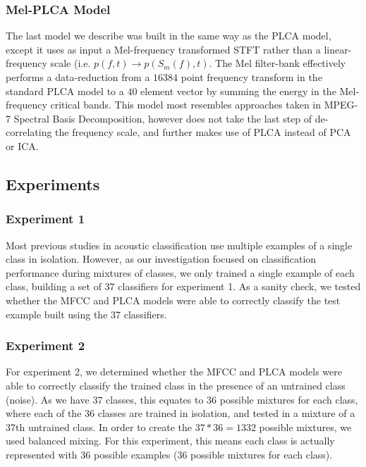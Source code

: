 \documentclass[a4paper,10pt,final]{ThesisStyle}
\begin{document}

\subsubsection{Mel-PLCA Model}

The last model we describe was built in the same way as the PLCA model, except it uses as input a Mel-frequency transformed STFT rather than a linear-frequency scale (i.e. $p(f,t) \rightarrow p(S_m(f),t)$.  The Mel filter-bank effectively performs a data-reduction from a $16384$ point frequency transform in the standard PLCA model to a $40$ element vector by summing the energy in the Mel-frequency critical bands.  This model most resembles approaches taken in MPEG-7 Spectral Basis Decomposition, however does not take the last step of de-correlating the frequency scale, and further makes use of PLCA instead of PCA or ICA.  %

\subsection{Experiments}
\subsubsection{Experiment 1}
Most previous studies in acoustic classification use multiple examples of a single class in isolation.  However, as our investigation focused on classification performance during mixtures of classes, we only trained a single example of each class, building a set of 37 classifiers for experiment 1.  As a sanity check, we tested whether the MFCC and PLCA models were able to correctly classify the test example built using the 37 classifiers.

\subsubsection{Experiment 2}
For experiment 2, we determined whether the MFCC and PLCA models were able to correctly classify the trained class in the presence of an untrained class (noise).  As we have 37 classes, this equates to 36 possible mixtures for each class, where each of the 36 classes are trained in isolation, and tested in a mixture of a 37th untrained class.  In order to create the $37*36 = 1332$ possible mixtures, we used balanced mixing.  For this experiment, this means each class is actually represented with 36 possible examples (36 possible mixtures for each class).  
\end{document}
